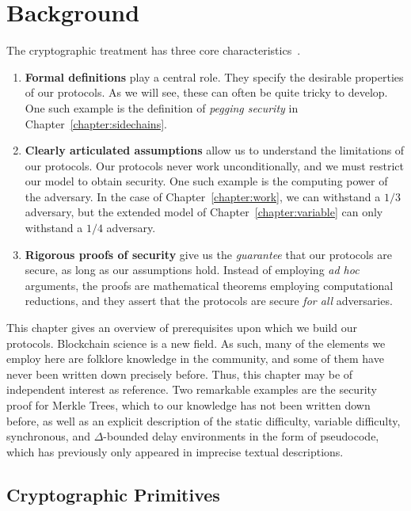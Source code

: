 \chapter{Background}\label{chapter:background}

The cryptographic treatment has three core characteristics~\cite{katz}.

\begin{enumerate}
  \item \textbf{Formal definitions} play a central role. They specify the
        desirable properties of our protocols. As we will see, these can often
        be quite tricky to develop. One such example is the definition of
        \emph{pegging security} in Chapter~\ref{chapter:sidechains}.
  \item \textbf{Clearly articulated assumptions} allow us to understand the
        limitations of our protocols. Our protocols never work
        unconditionally, and we must restrict our model to obtain security. One
        such example is the computing power of the adversary. In the case of
        Chapter~\ref{chapter:work}, we can withstand a $1/3$ adversary, but the
        extended model of Chapter~\ref{chapter:variable} can only withstand a
        $1/4$ adversary.
  \item \textbf{Rigorous proofs of security} give us the \emph{guarantee} that
        our protocols are secure, as long as our assumptions hold. Instead of
        employing \emph{ad hoc} arguments, the proofs are mathematical theorems
        employing computational reductions, and they assert that the protocols
        are secure \emph{for all} adversaries.
\end{enumerate}

This chapter gives an overview of prerequisites upon which we build our
protocols. Blockchain science is a new field. As such, many of the elements we
employ here are folklore knowledge in the community, and some of them have never
been written down precisely before. Thus, this chapter may be of independent
interest as reference. Two remarkable examples are the security proof for
Merkle Trees, which to our knowledge has not been written down before, as well
as an explicit description of the static difficulty, variable difficulty,
synchronous, and $\Delta$-bounded delay environments in the form of pseudocode,
which has previously only appeared in imprecise textual descriptions.



\section{Cryptographic Primitives}

